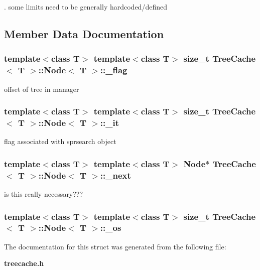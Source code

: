 . some limits need to be generally hardcoded/defined 



\subsection{Member Data Documentation}
\subsubsection{\setlength{\rightskip}{0pt plus 5cm}template$<$class T$>$ template$<$class T$>$ size\_\-t {\bf Tree\-Cache}$<$ T $>$::{\bf Node}$<$ T $>$::{\bf \_\-flag}}\label{structTreeCache_1_1Node_o1}


offset of tree in manager 

\subsubsection{\setlength{\rightskip}{0pt plus 5cm}template$<$class T$>$ template$<$class T$>$ size\_\-t {\bf Tree\-Cache}$<$ T $>$::{\bf Node}$<$ T $>$::{\bf \_\-it}}\label{structTreeCache_1_1Node_o2}


flag associated with sprsearch object 

\subsubsection{\setlength{\rightskip}{0pt plus 5cm}template$<$class T$>$ template$<$class T$>$ {\bf Node}$\ast$ {\bf Tree\-Cache}$<$ T $>$::{\bf Node}$<$ T $>$::{\bf \_\-next}}\label{structTreeCache_1_1Node_o3}


is this really necessary??? 

\subsubsection{\setlength{\rightskip}{0pt plus 5cm}template$<$class T$>$ template$<$class T$>$ size\_\-t {\bf Tree\-Cache}$<$ T $>$::{\bf Node}$<$ T $>$::{\bf \_\-os}}\label{structTreeCache_1_1Node_o0}




The documentation for this struct was generated from the following file:\begin{CompactItemize}
\item 
{\bf treecache.h}\end{CompactItemize}
